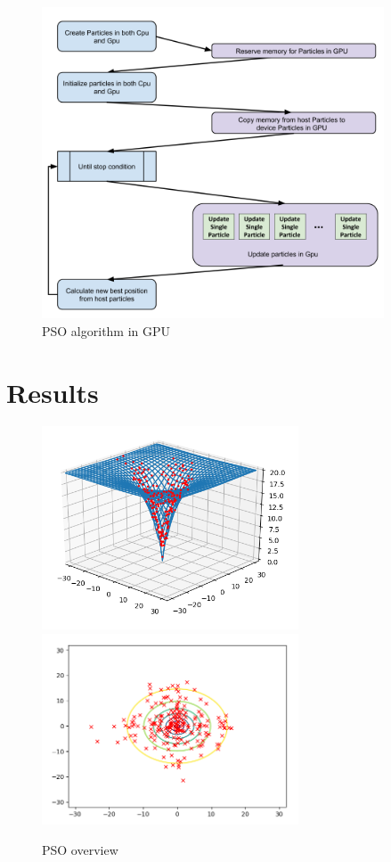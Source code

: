 \documentclass[journal]{IEEEtran}
\begin{document}
\begin{figure}
\centering
\includegraphics[width=4.0in]{_img/img_PSO_algorithm_gpu.png}
\caption{PSO algorithm in GPU}
\end{figure}

\section{Results}

\begin{figure}
\centering
\includegraphics[width=3.0in]{_img/img_PSO_test_2d_ackley_3dview.png}
\includegraphics[width=3.0in]{_img/img_PSO_test_2d_ackley_contours.png}
\caption{PSO overview}
\end{figure}
\end{document}
